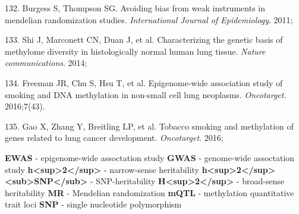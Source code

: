 \documentclass[11pt,twoside]{bristolthesis}
\newenvironment{cslreferences}%
  {}%
  {\par}
\begin{document}
\begin{cslreferences}
\leavevmode\hypertarget{ref-Burgess2011}{}%
132. Burgess S, Thompson SG. Avoiding bias from weak instruments in mendelian randomization studies. \emph{International Journal of Epidemiology}. 2011;

\leavevmode\hypertarget{ref-Shi2014}{}%
133. Shi J, Marconett CN, Duan J, et al. Characterizing the genetic basis of methylome diversity in histologically normal human lung tissue. \emph{Nature communications}. 2014;

\leavevmode\hypertarget{ref-Freeman2016}{}%
134. Freeman JR, Chu S, Hsu T, et al. Epigenome-wide association study of smoking and DNA methylation in non-small cell lung neoplasms. \emph{Oncotarget}. 2016;7(43).

\leavevmode\hypertarget{ref-Gao2016}{}%
135. Gao X, Zhang Y, Breitling LP, et al. Tobacco smoking and methylation of genes related to lung cancer development. \emph{Oncotarget}. 2016;
\end{cslreferences}
  \begin{abbreviations}
    \textbf{EWAS} - epigenome-wide assoctation study
    \textbf{GWAS} - genome-wide assoctation study
    \textbf{h<sup>2</sup>} - narrow-sense heritability
    \textbf{h<sup>2</sup><sub>SNP</sub>} - SNP-heritability
    \textbf{H<sup>2</sup>} - broad-sense heritability
    \textbf{MR} - Mendelian randomization
    \textbf{mQTL} - methylation quantitative trait loci
    \textbf{SNP} - single nucleotide polymorphism
  \end{abbreviations}
\end{document}
